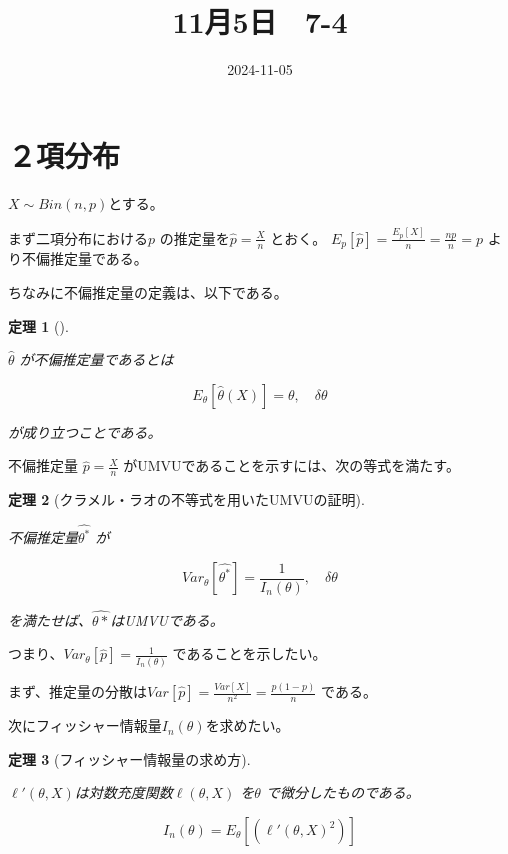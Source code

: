 \documentclass[
  letterpaper,
  DIV=11,
  numbers=noendperiod]{scrartcl}
\title{11月5日　7-4}
\author{}
\date{2024-11-05}
\renewcommand*\contentsname{目次}
\newcommand\contentsname{目次}
\theoremstyle{plain}
\newtheorem{theorem}{定理}[section]
\theoremstyle{remark}
\begin{document}
\maketitle

\renewcommand*\contentsname{目次}
{
\hypersetup{linkcolor=}
\setcounter{tocdepth}{3}
\tableofcontents
}

\section{２項分布}\label{ux9805ux5206ux5e03}

\(X \sim Bin(n,p)\)とする。

まず二項分布における\(p\)
の推定量を\(\displaystyle \hat{p}=\frac{X}{n}\) とおく。
\(\displaystyle E_p[\hat{p}] = \frac{E_p[X]}{n}=\frac{np}{n}=p\)
より不偏推定量である。

ちなみに不偏推定量の定義は、以下である。

\begin{theorem}[]\protect\hypertarget{thm-line}{}\label{thm-line}

\(\hat{\theta}\) が不偏推定量であるとは

\[
E_\theta[\hat{\theta}(X)] = \theta, \quad \delta\theta
\]

が成り立つことである。

\end{theorem}

不偏推定量 \(\displaystyle \hat{p}=\frac{X}{n}\)
がUMVUであることを示すには、次の等式を満たす。

\begin{theorem}[クラメル・ラオの不等式を用いたUMVUの証明]\protect\hypertarget{thm-line}{}\label{thm-line}

不偏推定量\(\hat{\theta^*}\) が

\[
Var_\theta[\hat{\theta^*}] = \frac{1}{I_n(\theta)},\quad \delta\theta
\]

を満たせば、\(\hat{\theta*}\)はUMVUである。

\end{theorem}

つまり、\(\displaystyle Var_\theta \left[\hat{p}\right] = \frac{1}{I_n(\theta)}\)
であることを示したい。

まず、推定量の分散は\(\displaystyle Var[\hat{p}]=\frac{Var[X]}{n^2}=\frac{p(1-p)}{n}\)
である。

次にフィッシャー情報量\(I_n(\theta)\)を求めたい。

\begin{theorem}[フィッシャー情報量の求め方]\protect\hypertarget{thm-line}{}\label{thm-line}

\(\ell'(\theta,X)\)は対数充度関数\(\ell(\theta,X)\) を\(\theta\)
で微分したものである。

\[
I_n(\theta) = E_\theta \left[(\ell'(\theta,X)^2)\right]
\]

\end{theorem}
\end{document}

